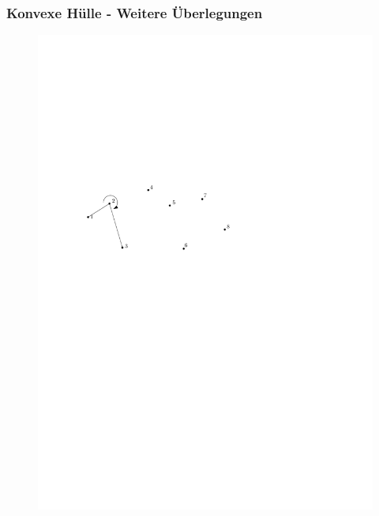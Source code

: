 \begin{frame}
	\frametitle{{Konvexe Hülle - Weitere Überlegungen}}
\begin{figure}[htbp]
	\begin{center}
  	\includegraphics[width=.8\linewidth]{bilder/graham2}
	\end{center}
\end{figure}
\end{frame}


